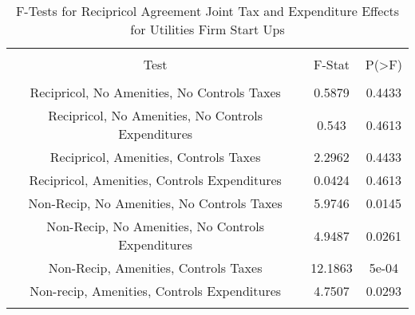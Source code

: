 
\begin{table}[!htbp] \centering 
  \caption{F-Tests for Recipricol Agreement Joint Tax and Expenditure Effects for Utilities Firm Start Ups} 
  \label{22Ftests} 
\begin{tabular}{@{\extracolsep{5pt}} ccc} 
\\[-1.8ex]\hline 
\hline \\[-1.8ex] 
Test & F-Stat & P(\textgreater F) \\ 
\hline \\[-1.8ex] 
Recipricol, No Amenities, No Controls Taxes & 0.5879 & 0.4433 \\ 
Recipricol, No Amenities, No Controls Expenditures & 0.543 & 0.4613 \\ 
Recipricol, Amenities, Controls Taxes & 2.2962 & 0.4433 \\ 
Recipricol, Amenities, Controls Expenditures & 0.0424 & 0.4613 \\ 
Non-Recip, No Amenities, No Controls Taxes & 5.9746 & 0.0145 \\ 
Non-Recip, No Amenities, No Controls Expenditures & 4.9487 & 0.0261 \\ 
Non-Recip, Amenities, Controls Taxes & 12.1863 & 5e-04 \\ 
Non-recip, Amenities, Controls Expenditures & 4.7507 & 0.0293 \\ 
\hline \\[-1.8ex] 
\end{tabular} 
\end{table} 
